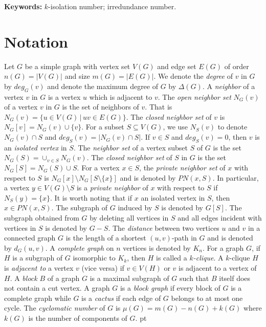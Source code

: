 \documentclass[11pt]{article}
\newcommand{\2}{ \vspace{0.2cm} }
\newcommand{\1}{ \vspace{0.1cm} }
\begin{document}
{\small \textbf{Keywords:} $k$-isolation number; irredundance number.} \\



\section{Notation}

Let $G$ be a simple graph with vertex set $V(G)$ and edge set $E(G)$ of order~$n(G) = |V(G)|$ and size $m(G) = |E(G)|$. We denote the \emph{degree} of $v$ in $G$ by $deg_G(v)$ and denote the maximum degree of $G$ by $\Delta(G)$. A \emph{neighbor} of a vertex $v$ in $G$ is a vertex $u$ which is adjacent to $v$. The \emph{open neighbor set} $N_G(v)$ of a vertex $v$ in $G$ is the set of neighbors of $v$. That is $N_G(v) = \{u \in V(G) \, | \, uv \in E(G)\}$. The \emph{closed neighbor set} of $v$ is $N_G[v] = N_G(v) \cup \{v\}$. For a subset $S \subseteq V(G)$, we use $N_{S}(v)$ to denote $N_{G}(v) \cap S$ and $deg_{S}(v) = |N_{G}(v) \cap S|$. If $v\in S$ and $deg_{S}(v) = 0$, then $v$ is an \emph{isolated vertex} in $S$. The \emph{neighbor set} of a vertex subset $S$ of $G$ is the set $N_G(S) = \cup_{v \in S} N_G(v)$. The \emph{closed neighbor set} of $S$ in $G$ is the set $N_G[S] = N_G(S) \cup S$. For a vertex $x \in S$, the \emph{private neighbor set} of $x$ with respect to $S$ is $N_{G}[x] \setminus N_{G}[S \setminus \{x\}] $ and is denoted by $PN(x, S)$. In particular, a vertex $y \in V(G) \setminus S$ is a \emph{private neighbor} of $x$ with respect to $S$ if $N_{S}(y) = \{x\}$. It is worth noting that if $x$ an isolated vertex in $S$, then $x \in PN(x, S)$. The subgraph of $G$ induced by $S$ is denoted by $G[S]$. The subgraph obtained from $G$ by deleting all vertices in $S$ and all edges incident with vertices in $S$ is denoted by $G - S$. The \emph{distance} between two vertices $u$ and $v$ in a connected graph $G$ is the length of a shortest $(u,v)$-path in $G$ and is denoted by $d_G(u,v)$. A \emph{complete graph} on $n$ vertices is denoted by $K_n$. For a graph $G$, if $H$ is a subgraph of $G$ isomorphic to $K_{k}$, then $H$ is called a $k$\emph{-clique}. A $k$-clique $H$ is \emph{adjacent to} a vertex $v$ (vice versa) if $v \in V(H)$ or $v$ is adjacent to a vertex of $H$. A \emph{block} $B$ of a graph $G$ is a maximal subgraph of $G$ such that $B$ itself does not contain a cut vertex. A graph $G$ is a \emph{block graph} if every block of $G$ is a complete graph while $G$ is a \emph{cactus} if each edge of $G$ belongs to at most one cycle. The \emph{cyclomatic number} of $G$ is $\mu(G) = m(G) - n(G) + k(G)$ where $k(G)$ is the number of components of $G$.
 pt
\end{document}
